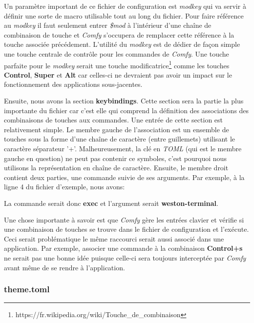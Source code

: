 \documentclass[titlepage]{article}
\begin{document}
\par
Un paramètre important de ce fichier de configuration est \textit{modkey} qui va servir à définir une sorte de macro utilisable tout au long du fichier. Pour faire référence au \textit{modkey} il faut seulement entrer \textit{\$mod} à l'intérieur d'une chaîne de combinaison de touche et \textit{Comfy} s'occupera de remplacer cette référence à la touche associée précédement. L'utilité du \textit{modkey} est de dédier de façon simple une touche centrale de contrôle pour les commandes de \textit{Comfy}. Une touche parfaite pour le \textit{modkey} serait une touche modificatrice\footnote{https://fr.wikipedia.org/wiki/Touche\_de\_combinaison} comme les touches \textbf{Control}, \textbf{Super} et \textbf{Alt} car celles-ci ne devraient pas avoir un impact sur le fonctionnement des applications sous-jacentes.
\par
\bigskip
Ensuite, nous avons la section \textbf{keybindings}. Cette section sera la partie la plus importante du fichier car c'est elle qui comprend la définition des associations des combinaisons de touches aux commandes. Une entrée de cette section est relativement simple. Le membre gauche de l'association est un ensemble de touches sous la forme d'une chaîne de caractère (entre guillemets) utilisant le caractère séparateur '+'. Malheureusement, la clé en \textit{TOML} (qui est le membre gauche en question) ne peut pas contenir ce symboles, c'est pourquoi nous utilisons la représentation en chaîne de caractère. Ensuite, le membre droit contient deux parties, une commande suivie de ses arguments. Par exemple, à la ligne 4 du fichier d'exemple, nous avons:



La commande serait donc \textbf{exec} et l'argument serait
\textbf{weston-terminal}.

\par
\bigskip
Une chose importante à savoir est que \textit{Comfy} gère les entrées clavier et vérifie si une combinaison de touches se trouve dans le fichier de configuration et l'exécute. Ceci serait problématique le même raccourci serait aussi associé dans une application. Par exemple, associer une commande à la combinaison \textbf{Control+s} ne serait pas une bonne idée puisque celle-ci sera toujours interceptée par \textit{Comfy} avant même de se rendre à l'application.

\subsubsection{theme.toml}
\begin{minipage}{\linewidth}
	
\end{minipage}
\end{document}

